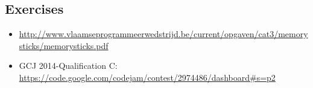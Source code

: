 \subsection{Exercises}
\begin{itemize}
 \item \url{http://www.vlaamseprogrammeerwedstrijd.be/current/opgaven/cat3/memorysticks/memorysticks.pdf}
 \item GCJ 2014-Qualification C: \url{https://code.google.com/codejam/contest/2974486/dashboard#s=p2}
\end{itemize}

